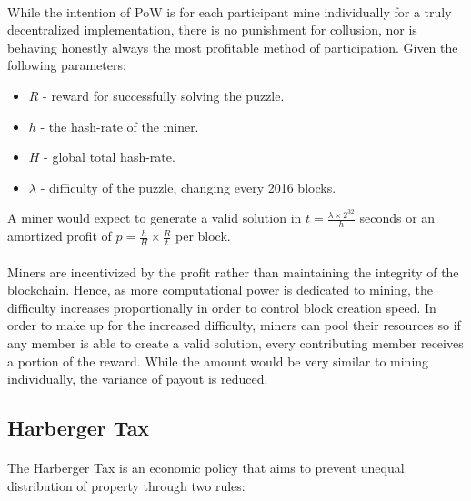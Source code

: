 \paragraph{} While the intention of PoW is for each participant mine individually for a truly decentralized implementation, there is no punishment for collusion, nor is behaving honestly always the most profitable method of participation. Given the following parameters:

\begin{itemize}
  \item $R$ - reward for successfully solving the puzzle.
  \item $h$ - the hash-rate of the miner.
  \item $H$ - global total hash-rate.
  \item $\lambda$ - difficulty of the puzzle, changing every 2016 blocks.
\end{itemize}

\noindent A miner would expect to generate a valid solution in $t = \frac{\lambda \times 2^{32}}{h}$ \cite{difficulty2019} seconds or an amortized profit of $p = \frac{h}{H} \times \frac{R}{t}$ per block.

\paragraph{} Miners are incentivized by the profit rather than maintaining the integrity of the blockchain. Hence, as  more computational power is dedicated to mining, the difficulty increases proportionally in order to control block creation speed. In order to make up for the increased difficulty, miners can pool their resources so if any member is able to create a valid solution, every contributing member receives a portion of the reward. While the amount would be very similar to mining individually, the variance of payout is reduced.

\subsection{Harberger Tax} \label{section:harbergerstax}


\paragraph{} The Harberger Tax is an economic policy that aims to prevent unequal distribution of property through two rules:

